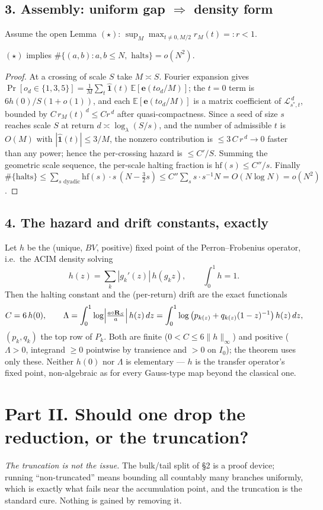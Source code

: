 \documentclass[11pt]{article}
\theoremstyle{remark}\newtheorem{remark}{Remark}
\newcommand{\Lop}{\mathcal L}\newcommand{\e}{\mathbf e}\newcommand{\D}{\mathcal D}\newcommand{\Leb}{\mathrm{Leb}}
\begin{document}
\subsection*{3. Assembly: uniform gap $\Rightarrow$ density form}
Assume the open Lemma $(\star)$: $\sup_M\max_{t\neq0,M/2}r_M(t)=:r<1$.
\begin{proposition}
$(\star)$ implies $\#\{(a,b):a,b\le N,\text{ halts}\}=o(N^2)$.
\end{proposition}
\begin{proof}
At a crossing of scale $S$ take $M\asymp S$. Fourier expansion gives
$\Pr[o_d\in\{1,3,5\}]=\tfrac1M\sum_t\widehat{\mathbf 1}(t)\,
\mathbb E[\e(t o_d/M)]$; the $t=0$ term is $6h(0)/S(1+o(1))$, and each
$\mathbb E[\e(to_d/M)]$ is a matrix coefficient of $\Lop_{s^\ast,t}^{\,d}$,
bounded by $C\,r_M(t)^{\,d}\le C r^{\,d}$ after quasi-compactness. Since a
seed of size $s$ reaches scale $S$ at return $d\asymp\log_\lambda(S/s)$, and
the number of admissible $t$ is $O(M)$ with $|\widehat{\mathbf 1}(t)|\le3/M$,
the nonzero contribution is $\le 3\,C\,r^{\,d}\to0$ faster than any power;
hence the per-crossing hazard is $\le C'/S$. Summing the geometric scale
sequence, the per-scale halting fraction is $\mathrm{hf}(s)\le C''/s$. Finally
$\#\{\text{halts}\}\le\sum_{s\text{ dyadic}}\mathrm{hf}(s)\cdot s\,(N-\tfrac32 s)
\le C''\sum_{s}s\cdot s^{-1}N=O(N\log N)=o(N^2)$.
\end{proof}

\subsection*{4. The hazard and drift constants, exactly}
Let $h$ be the (unique, $BV$, positive) fixed point of the Perron--Frobenius
operator, i.e.\ the ACIM density solving
\[
h(z)=\sum_k |g_k'(z)|\,h(g_k z),\qquad \int_0^1 h=1.
\]
Then the halting constant and the (per-return) drift are the exact functionals
\[
C=6\,h(0),\qquad
\Lambda=\int_0^1 \log\!\Big|\tfrac{a\circ\mathbf{R}_S}{a}\Big|\,h(z)\,dz
=\int_0^1 \log\big(p_{k(z)}+q_{k(z)}(1-z)^{-1}\big)\,h(z)\,dz,
\]
$(p_k,q_k)$ the top row of $P_k$. Both are finite ($0<C\le6\|h\|_\infty$) and
positive ($\Lambda>0$, integrand $\ge0$ pointwise by transience and $>0$ on
$I_0$); the theorem uses only these. Neither $h(0)$ nor $\Lambda$ is
elementary --- $h$ is the transfer operator's fixed point, non-algebraic as
for every Gauss-type map beyond the classical one.

\section*{Part II. Should one drop the reduction, or the truncation?}
\emph{The truncation is not the issue.} The bulk/tail split of \S2 is a proof
device; running ``non-truncated'' means bounding all countably many branches
uniformly, which is exactly what fails near the accumulation point, and the
truncation is the standard cure. Nothing is gained by removing it.
\end{document}
